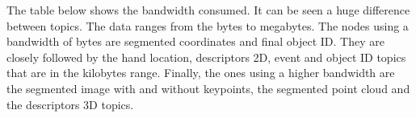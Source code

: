 			The table below shows the bandwidth consumed. 
			It can be seen a huge difference between topics. 
			The data ranges from the bytes to megabytes. 
			The nodes using a bandwidth of bytes are segmented coordinates and final object ID. 
			They are closely followed by the hand location, descriptors 2D, event and object ID topics that are in the kilobytes range. 
			Finally, the ones using a higher bandwidth are the segmented image with and without keypoints, the segmented point cloud and the descriptors 3D topics. 






